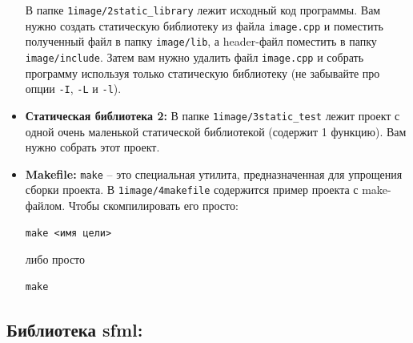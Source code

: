 \documentclass{article}
\begin{document}
\begin{itemize}
\begin{enumerate}
\begin{verbatim}
\end{verbatim}
\end{enumerate}
В папке \texttt{1image/2static\_library} лежит исходный код программы. Вам нужно создать статическую библиотеку из файла \texttt{image.cpp} и поместить полученный файл в папку \texttt{image/lib}, а header-файл поместить в папку \texttt{image/include}. Затем вам нужно удалить файл \texttt{image.cpp} и собрать программу используя только статическую библиотеку (не забывайте про опции \texttt{-I}, \texttt{-L} и \texttt{-l}).
\item \textbf{Статическая библиотека 2:} В папке \texttt{1image/3static\_test} лежит проект с одной очень маленькой статической библиотекой (содержит 1 функцию). Вам нужно собрать этот проект.
\item \textbf{Makefile:} \texttt{make} -- это специальная утилита, предназначенная для упрощения сборки проекта. В \texttt{1image/4makefile} содержится пример проекта с make-файлом. Чтобы скомпилировать его просто:
\begin{verbatim}
make <имя цели>
\end{verbatim}
либо просто
\begin{verbatim}
make
\end{verbatim}
\end{itemize}

\subsection*{Библиотека sfml:}
\end{document}

